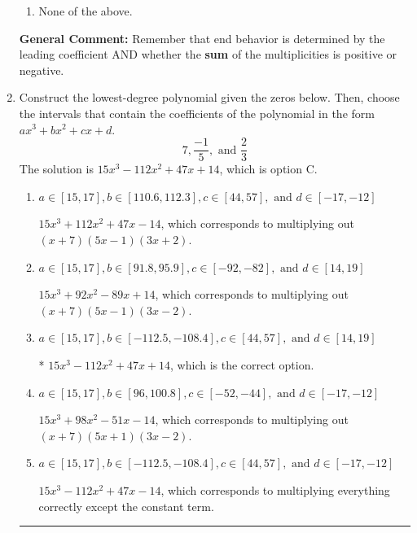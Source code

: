 \documentclass{extbook}[14pt]
\newcommand{\litem}[1]{\item #1

\rule{\textwidth}{0.4pt}}
\begin{document}
\begin{enumerate}
{\begin{enumerate}[label=\Alph*.]
\item None of the above.\end{enumerate}
\textbf{General Comment:} Remember that end behavior is determined by the leading coefficient AND whether the \textbf{sum} of the multiplicities is positive or negative.
}
\litem{
Construct the lowest-degree polynomial given the zeros below. Then, choose the intervals that contain the coefficients of the polynomial in the form $ax^3+bx^2+cx+d$.
\[ 7, \frac{-1}{5}, \text{ and } \frac{2}{3} \]The solution is \( 15x^{3} -112 x^{2} +47 x + 14 \), which is option C.\begin{enumerate}[label=\Alph*.]
\item \( a \in [15, 17], b \in [110.6, 112.3], c \in [44, 57], \text{ and } d \in [-17, -12] \)

$15x^{3} +112 x^{2} +47 x -14$, which corresponds to multiplying out $(x + 7)(5x -1)(3x + 2)$.
\item \( a \in [15, 17], b \in [91.8, 95.9], c \in [-92, -82], \text{ and } d \in [14, 19] \)

$15x^{3} +92 x^{2} -89 x + 14$, which corresponds to multiplying out $(x + 7)(5x -1)(3x -2)$.
\item \( a \in [15, 17], b \in [-112.5, -108.4], c \in [44, 57], \text{ and } d \in [14, 19] \)

* $15x^{3} -112 x^{2} +47 x + 14$, which is the correct option.
\item \( a \in [15, 17], b \in [96, 100.8], c \in [-52, -44], \text{ and } d \in [-17, -12] \)

$15x^{3} +98 x^{2} -51 x -14$, which corresponds to multiplying out $(x + 7)(5x + 1)(3x -2)$.
\item \( a \in [15, 17], b \in [-112.5, -108.4], c \in [44, 57], \text{ and } d \in [-17, -12] \)

$15x^{3} -112 x^{2} +47 x -14$, which corresponds to multiplying everything correctly except the constant term.
\end{enumerate}

}
\end{enumerate}
\end{document}
